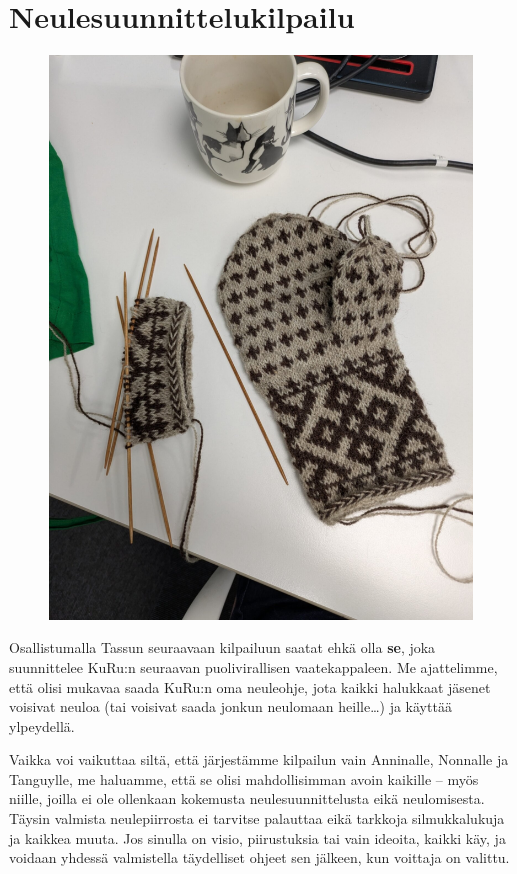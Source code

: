 
\section{Neulesuunnittelukilpailu}\label{sec:neulekilpailu}

\begin{figure}
	\noindent\includegraphics[width=0.9\linewidth]{assets/neulekilpailu1}
\end{figure}

Osallistumalla Tassun seuraavaan kilpailuun saatat ehkä olla \textbf{se},
joka suunnittelee KuRu:n seuraavan puolivirallisen vaatekappaleen. Me
ajattelimme, että olisi mukavaa saada KuRu:n oma neuleohje, jota kaikki
halukkaat jäsenet voisivat neuloa {\tiny(tai voisivat saada jonkun neulomaan
heille\ldots)} ja käyttää ylpeydellä.

Vaikka voi vaikuttaa siltä, että järjestämme kilpailun vain Anninalle,
\mbox{Nonnalle} ja Tanguylle, me haluamme, että se olisi mahdollisimman avoin
kaikille -- myös niille, joilla ei ole ollenkaan kokemusta neulesuunnittelusta
eikä neulomisesta. Täysin valmista neulepiirrosta ei tarvitse palauttaa eikä
\mbox{tarkkoja} silmukkalukuja ja kaikkea muuta. Jos sinulla on visio,
piirustuksia tai vain ideoita, kaikki käy, ja voidaan yhdessä valmistella
täydelliset ohjeet sen jälkeen, kun voittaja on valittu.

